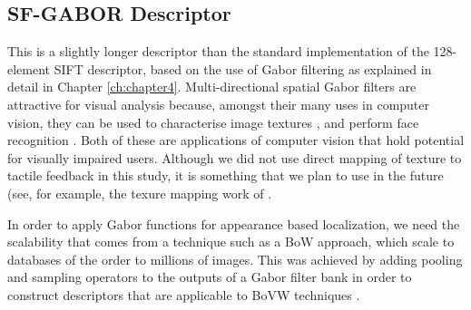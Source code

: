 \subsection{SF-GABOR Descriptor}
This is a slightly longer descriptor than the standard implementation of the 128-element SIFT descriptor, based on the use of Gabor filtering as explained in detail in Chapter \ref{ch:chapter4}.  Multi-directional spatial Gabor filters are attractive for visual analysis because, amongst their many uses in computer vision, they can be used to characterise image textures \citep{jain1990unsupervised,weldon1996efficient,adi2009texture}, and perform face recognition \citep{yang2013gabor}. Both of these are applications of computer vision that hold potential for visually impaired users. Although we did not use direct mapping of texture to tactile feedback in this study, it is something that we plan to use in the future (see, for example, the texure mapping work of \cite{adi2009texture}. 

In order to apply Gabor functions for appearance based localization, we need the scalability that comes from a technique such as a BoW approach, which scale to databases of the order to millions of images. This was achieved by adding pooling and sampling operators to the outputs of a Gabor filter bank in order to construct descriptors that are applicable to BoVW techniques \citep{nister2006scalable}.  

